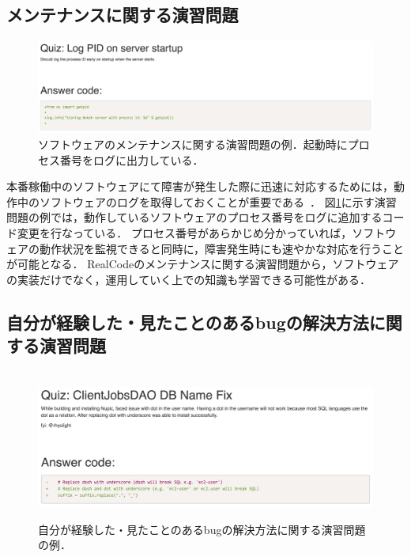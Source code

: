 \subsection{メンテナンスに関する演習問題}

\begin{figure}[t]
	\centering
  \includegraphics[width=1.0\columnwidth]{20190107-lab-study-maintenance-exercise.png}
  \caption{ソフトウェアのメンテナンスに関する演習問題の例．起動時にプロセス番号をログに出力している．}
  \label{fig:lab-study-eg-maintenance}
  \vspace{0.5cm}
\end{figure}

本番稼働中のソフトウェアにて障害が発生した際に迅速に対応するためには，動作中のソフトウェアのログを取得しておくことが重要である~\cite{kernighan1999practice}．
図\ref{fig:lab-study-eg-maintenance}に示す演習問題の例では，動作しているソフトウェアのプロセス番号をログに追加するコード変更を行なっている．
プロセス番号があらかじめ分かっていれば，ソフトウェアの動作状況を監視できると同時に，障害発生時にも速やかな対応を行うことが可能となる．
RealCodeのメンテナンスに関する演習問題から，ソフトウェアの実装だけでなく，運用していく上での知識も学習できる可能性がある．

\subsection{自分が経験した・見たことのあるbugの解決方法に関する演習問題}

\begin{figure}[t]
　\centering
　\includegraphics[width=1.0\columnwidth]{20190107-lab-study-experience-exercise.png}
  \caption{自分が経験した・見たことのあるbugの解決方法に関する演習問題の例．}
  \label{fig:lab-study-eg-experience}
\end{figure}

